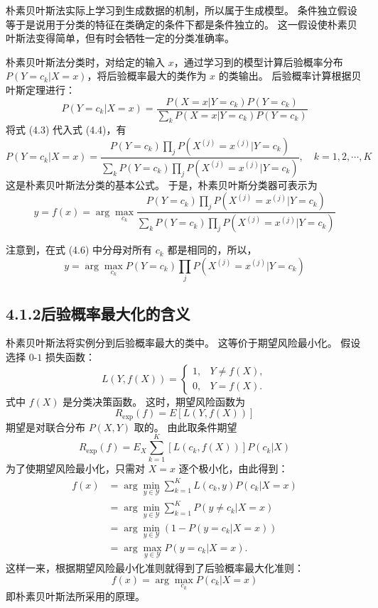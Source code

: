 \documentclass[UTF8, 12pt, fontset=fandol, oneside]{ctexart}
\begin{document}
朴素贝叶斯法实际上学习到生成数据的机制，所以属于生成模型。
条件独立假设等于是说用于分类的特征在类确定的条件下都是条件独立的。
这一假设使朴素贝叶斯法变得简单，但有时会牺牲一定的分类准确率。

朴素贝叶斯法分类时，对给定的输入 $x$，通过学习到的模型计算后验概率分布 $P(Y=c_k|X=x)$，将后验概率最大的类作为 $x$ 的类输出。
后验概率计算根据贝叶斯定理进行：
\begin{equation}
  P(Y=c_k|X=x)
  =
  \frac{P(X=x|Y=c_k)P(Y=c_k)}
       {\sum_k P(X=x|Y=c_k)P(Y=c_k)}
  \tag{4.4}
\end{equation}
将式 (4.3) 代入式 (4.4)，有
\begin{equation}
  P(Y=c_k|X=x)
  =
  \frac{P(Y=c_k)\prod_j P(X^{(j)}=x^{(j)}|Y=c_k)}
       {\sum_k P(Y=c_k)\prod_j P(X^{(j)}=x^{(j)}|Y=c_k)},
  \quad k=1,2,\cdots,K
  \tag{4.5}
\end{equation}
这是朴素贝叶斯法分类的基本公式。
于是，朴素贝叶斯分类器可表示为
\begin{equation}
  y=f(x)=\arg\max_{c_k}
  \frac{P(Y=c_k)\prod_j P(X^{(j)}=x^{(j)}|Y=c_k)}
       {\sum_k P(Y=c_k)\prod_j P(X^{(j)}=x^{(j)}|Y=c_k)}
  \tag{4.6}
\end{equation}

注意到，在式 (4.6) 中分母对所有 $c_k$ 都是相同的，所以，
\begin{equation}
  y=\arg\max_{c_k} P(Y=c_k)\prod_j P(X^{(j)}=x^{(j)}|Y=c_k)
  \tag{4.7}
\end{equation}

\subsection*{4.1.2\quad 后验概率最大化的含义}

朴素贝叶斯法将实例分到后验概率最大的类中。
这等价于期望风险最小化。
假设选择 $0$-$1$ 损失函数：
\[
  L(Y,f(X))=
  \begin{cases}
    1, & Y\ne f(X),\\
    0, & Y=f(X).
  \end{cases}
\]
式中 $f(X)$ 是分类决策函数。
这时，期望风险函数为
\[
  R_{\mathrm{exp}}(f)=E[L(Y,f(X))]
\]
期望是对联合分布 $P(X,Y)$ 取的。
由此取条件期望
\[
  R_{\mathrm{exp}}(f)=E_X\sum_{k=1}^K [L(c_k,f(X))]P(c_k|X)
\]
为了使期望风险最小化，只需对 $X=x$ 逐个极小化，由此得到：
\[
\begin{aligned}
  f(x)
  &=\arg\min_{y\in\mathcal{Y}}\sum_{k=1}^K L(c_k,y)P(c_k|X=x) \\
  &=\arg\min_{y\in\mathcal{Y}}\sum_{k=1}^K P(y\ne c_k|X=x) \\
  &=\arg\min_{y\in\mathcal{Y}}(1-P(y=c_k|X=x)) \\
  &=\arg\max_{y\in\mathcal{Y}}P(y=c_k|X=x).
\end{aligned}
\]
这样一来，根据期望风险最小化准则就得到了后验概率最大化准则：
\[
  f(x)=\arg\max_{c_k}P(c_k|X=x)
\]
即朴素贝叶斯法所采用的原理。
\end{document}
